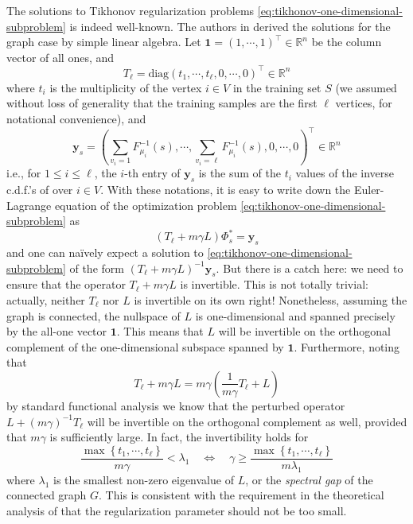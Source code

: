 \documentclass[letterpaper]{article} %
\begin{document}
The solutions to Tikhonov regularization problems \eqref{eq:tikhonov-one-dimensional-subproblem} is indeed well-known. The authors in \cite{Belkin2004} derived the solutions for the graph case by simple linear algebra. Let $\mathbf{1}=\left( 1,\cdots,1 \right)^{\top}\in\mathbb{R}^n$ be the column vector of all ones, and
$$T_\ell=\mathrm{diag}\left( t_1,\cdots,t_{\ell},0,\cdots,0 \right)^{\top}\in\mathbb{R}^n$$
where $t_i$ is the multiplicity of the vertex $i\in V$ in the training set $S$ (we assumed without loss of generality that the training samples are the first $\ell$ vertices, for notational convenience), and
\begin{equation}
  \label{eq:y-defn}
  \mathbf{y}_s=\left( \sum_{v_{i}=1}F_{\mu_i}^{-1}\left( s \right),\cdots,\sum_{v_i=\ell}F_{\mu_i}^{-1}\left( s \right),0,\cdots,0 \right)^{\top}\in\mathbb{R}^n
\end{equation}
i.e., for $1\leq i\leq \ell$, the $i$-th entry of $\mathbf{y}_s$ is the sum of the $t_i$ values of the inverse c.d.f.'s of over $i\in V$. With these notations, it is easy to write down the Euler-Lagrange equation of the optimization problem \eqref{eq:tikhonov-one-dimensional-subproblem} as
\begin{equation}
  \label{eq:tikhonov-one-dimensional-subproblem-euler-lagrange}
  \left( T_{\ell}+m\gamma L \right)\Phi_s^{*}=\mathbf{y}_s
\end{equation}
and one can na\"ively expect a solution to \eqref{eq:tikhonov-one-dimensional-subproblem} of the form $\left( T_{\ell}+m\gamma L \right)^{-1}\mathbf{y}_s$. But there is a catch here: we need to ensure that the operator $T_{\ell}+m\gamma L$ is invertible. This is not totally trivial: actually, neither $T_{\ell}$ nor $L$ is invertible on its own right! Nonetheless, assuming the graph is connected, the nullspace of $L$ is one-dimensional and spanned precisely by the all-one vector $\mathbf{1}$. This means that $L$ will be invertible on the orthogonal complement of the one-dimensional subspace spanned by $\mathbf{1}$. Furthermore, noting that
\begin{equation}
  \label{eq:standard-functional-analysis}
  T_{\ell}+m\gamma L=m\gamma \left( \frac{1}{m\gamma}T_{\ell}+L \right)
\end{equation}
by standard functional analysis we know that the perturbed operator $L+\left( m\gamma \right)^{-1}T_{\ell}$ will be invertible on the orthogonal complement as well, provided that $m\gamma$ is sufficiently large. In fact, the invertibility holds for
\begin{equation*}
  \frac{\max \left\{ t_1,\cdots,t_{\ell} \right\}}{m\gamma}<\lambda_1\quad\Leftrightarrow\quad \gamma\geq \frac{\max \left\{ t_1,\cdots,t_{\ell} \right\}}{m\lambda_1}
\end{equation*}
where $\lambda_1$ is the smallest non-zero eigenvalue of $L$, or the \emph{spectral gap} of the connected graph $G$. This is consistent with the requirement in the theoretical analysis of \cite{Belkin2004} that the regularization parameter should not be too small.
\end{document}
